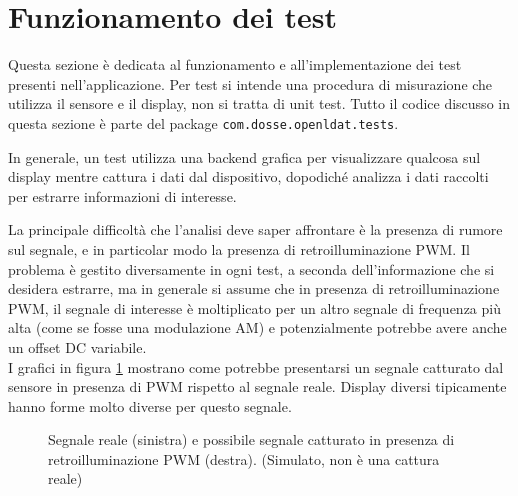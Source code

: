 \section{Funzionamento dei test}
Questa sezione è dedicata al funzionamento e all'implementazione dei test presenti nell'applicazione. Per test si intende una procedura di misurazione che utilizza il sensore e il display, non si tratta di unit test. Tutto il codice discusso in questa sezione è parte del package \texttt{com.dosse.openldat.tests}.

In generale, un test utilizza una backend grafica per visualizzare qualcosa sul display mentre cattura i dati dal dispositivo, dopodiché analizza i dati raccolti per estrarre informazioni di interesse.

La principale difficoltà che l'analisi deve saper affrontare è la presenza di rumore sul segnale, e in particolar modo la presenza di retroilluminazione PWM. Il problema è gestito diversamente in ogni test, a seconda dell'informazione che si desidera estrarre, ma in generale si assume che in presenza di retroilluminazione PWM, il segnale di interesse è moltiplicato per un altro segnale di frequenza più alta (come se fosse una modulazione AM) e potenzialmente potrebbe avere anche un offset DC variabile.\\
I grafici in figura \ref{fig:pwm_example} mostrano come potrebbe presentarsi un segnale catturato dal sensore in presenza di PWM rispetto al segnale reale. Display diversi tipicamente hanno forme molto diverse per questo segnale.
\begin{figure}[H]
	\centering
	\caption{Segnale reale (sinistra) e possibile segnale catturato in presenza di retroilluminazione PWM (destra). (Simulato, non è una cattura reale)}
	\label{fig:pwm_example}
\end{figure}

